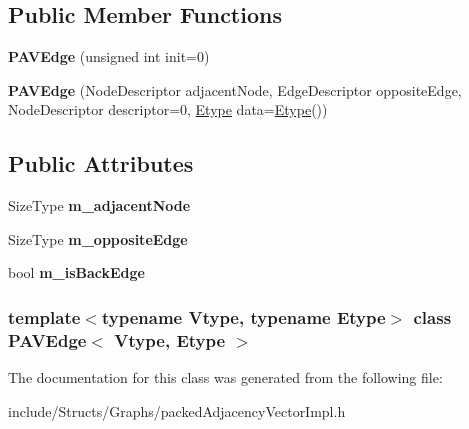 \subsection*{Public Member Functions}
\begin{DoxyCompactItemize}
\item 
\hypertarget{class_p_a_v_edge_a17c20fa64072e4dca5a47b914e5fca3f}{
{\bfseries PAVEdge} (unsigned int init=0)}
\label{class_p_a_v_edge_a17c20fa64072e4dca5a47b914e5fca3f}

\item 
\hypertarget{class_p_a_v_edge_afb9ae2248e7d112f92989c448260a62f}{
{\bfseries PAVEdge} (NodeDescriptor adjacentNode, EdgeDescriptor oppositeEdge, NodeDescriptor descriptor=0, \hyperlink{class_etype}{Etype} data=\hyperlink{class_etype}{Etype}())}
\label{class_p_a_v_edge_afb9ae2248e7d112f92989c448260a62f}

\end{DoxyCompactItemize}
\subsection*{Public Attributes}
\begin{DoxyCompactItemize}
\item 
\hypertarget{class_p_a_v_edge_a31a0d05939b0687ddf414a76e7c4349d}{
SizeType {\bfseries m\_\-adjacentNode}}
\label{class_p_a_v_edge_a31a0d05939b0687ddf414a76e7c4349d}

\item 
\hypertarget{class_p_a_v_edge_a74d255829345d1fc1b0ac28e0e9f4e1d}{
SizeType {\bfseries m\_\-oppositeEdge}}
\label{class_p_a_v_edge_a74d255829345d1fc1b0ac28e0e9f4e1d}

\item 
\hypertarget{class_p_a_v_edge_aea11791e9169330056be8507f46c5b0a}{
bool {\bfseries m\_\-isBackEdge}}
\label{class_p_a_v_edge_aea11791e9169330056be8507f46c5b0a}

\end{DoxyCompactItemize}
\subsubsection*{template$<$typename Vtype, typename Etype$>$ class PAVEdge$<$ Vtype, Etype $>$}



The documentation for this class was generated from the following file:\begin{DoxyCompactItemize}
\item 
include/Structs/Graphs/packedAdjacencyVectorImpl.h\end{DoxyCompactItemize}
